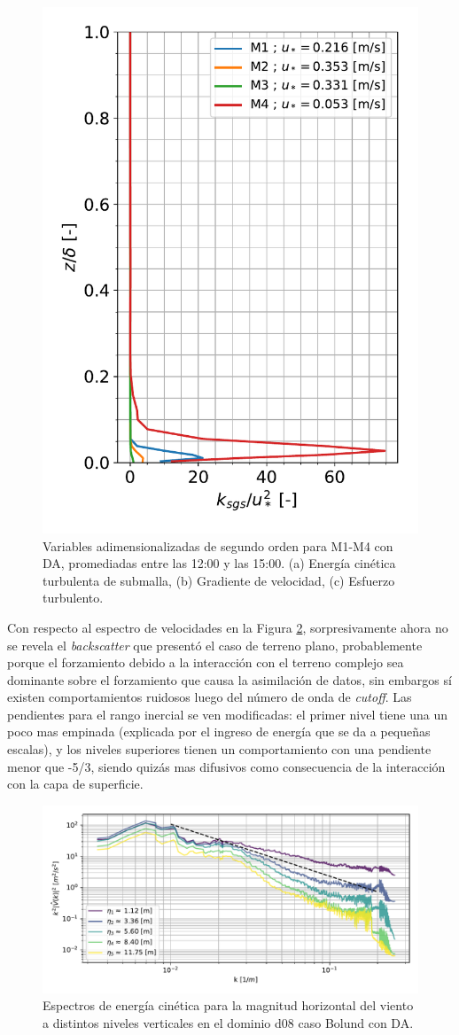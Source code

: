 \begin{figure}[H]
\begin{center}
		\includegraphics[height=0.5\linewidth,page=3,trim={12mm 5mm 3mm 0mm},clip]{Imagenes/06/bol_da/second_order_mean}%
	\end{center}
	\vspace{-5mm}
	\caption{Variables adimensionalizadas de segundo orden para M1-M4 con DA, promediadas entre las 12:00 y las 15:00. (a) Energía cinética turbulenta de submalla, (b) Gradiente de velocidad, (c) Esfuerzo turbulento. }
	\label{fig:06_bol_da_mean_secondorder}
\end{figure}
Con respecto al espectro de velocidades en la Figura \ref{fig:06_bol_da_spectrum}, sorpresivamente ahora no se revela el \emph{backscatter} que presentó el caso de terreno plano, probablemente porque el forzamiento debido a la interacción con el terreno complejo sea dominante sobre el forzamiento que causa la asimilación de datos, sin embargos sí existen comportamientos ruidosos luego del número de onda de \emph{cutoff}. Las pendientes para el rango inercial se ven modificadas: el primer nivel tiene una un poco mas empinada (explicada por el ingreso de energía que se da a pequeñas escalas), y los niveles superiores tienen un comportamiento con una pendiente menor que -5/3, siendo quizás mas difusivos como consecuencia de la interacción con la capa de superficie.
\newpage
\begin{figure}[H]
	\centering
	\includegraphics[width=1.0\linewidth,page=1,trim={3mm 5mm 3mm 3mm},clip]{Imagenes/06/bol_da/spectra}%
	\caption{Espectros de energía cinética para la magnitud horizontal del viento a distintos niveles verticales en el dominio d08 caso Bolund con DA.}
	\label{fig:06_bol_da_spectrum}
\end{figure}
